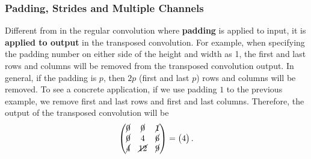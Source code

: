 \subsubsection{Padding, Strides and Multiple Channels}

Different from in the regular convolution where \textbf{padding} is applied to input, it is \textbf{applied to output} in the transposed convolution. For example, when specifying the padding number on either side of the height and width as 1, the first and last rows and columns will be removed from the transposed convolution output. In general, if the padding is $p$, then $2p$ (first and last $p$) rows and columns will be removed. To see a concrete application, if we use padding $1$ to the previous example, we remove first and last rows and first and last columns. Therefore, the output of the transposed convolution will be
$$
\begin{pmatrix}
\cancel{0} & \cancel{0} & \cancel{1} \\
\cancel{0} & 4 & \cancel{6} \\
\cancel{4} & \cancel{12} & \cancel{9}
\end{pmatrix} =
\begin{pmatrix}
    4
\end{pmatrix}.
$$

